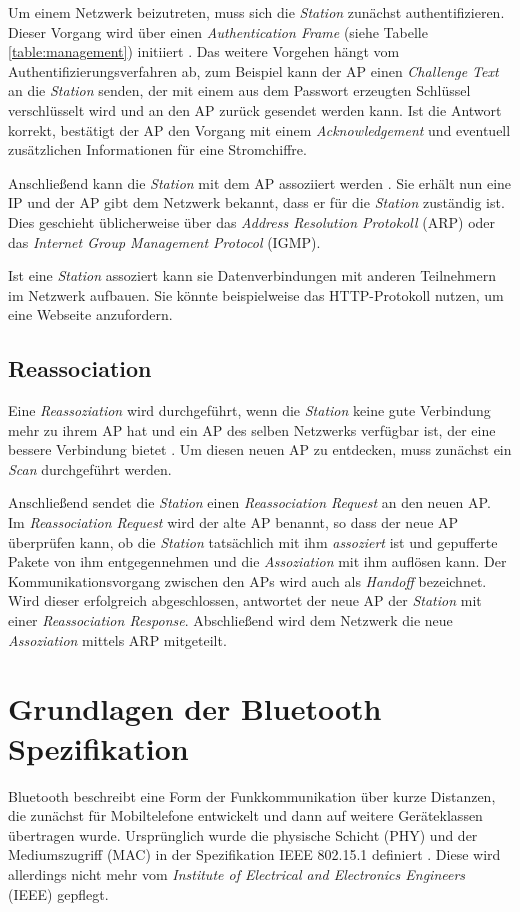 Um einem Netzwerk beizutreten, muss sich die \emph{Station} zunächst authentifizieren. 
Dieser Vorgang wird über einen \emph{Authentication Frame} (siehe Tabelle \ref{table:management}) initiiert \cite{ieee2012auth}. 
Das weitere Vorgehen hängt vom Authentifizierungsverfahren ab, zum Beispiel kann der AP einen \emph{Challenge Text} an die \emph{Station} senden, der mit einem aus dem Passwort erzeugten Schlüssel verschlüsselt wird und an den AP zurück gesendet werden kann. 
Ist die Antwort korrekt, bestätigt der AP den Vorgang mit einem \emph{Acknowledgement} und eventuell zusätzlichen Informationen für eine Stromchiffre. 

Anschließend kann die \emph{Station} mit dem AP assoziiert werden \cite{ieee2012associate}. 
Sie erhält nun eine IP und der AP gibt dem Netzwerk bekannt, dass er für die \emph{Station} zuständig ist. 
Dies geschieht üblicherweise über das \emph{Address Resolution Protokoll} (ARP) oder das \emph{Internet Group Management Protocol} (IGMP).

Ist eine \emph{Station} assoziert kann sie Datenverbindungen mit anderen Teilnehmern im Netzwerk aufbauen.
Sie könnte beispielweise das HTTP-Protokoll nutzen, um eine Webseite anzufordern.

\subsection{Reassociation}
Eine \emph{Reassoziation} wird durchgeführt, wenn die \emph{Station} keine gute Verbindung mehr zu ihrem AP hat und ein AP des selben Netzwerks verfügbar ist, der eine bessere Verbindung bietet \cite{ieee2012reassociate}.
Um diesen neuen AP zu entdecken, muss zunächst ein \emph{Scan} durchgeführt werden. 

Anschließend sendet die \emph{Station} einen \emph{Reassociation Request} an den neuen AP. 
Im \emph{Reassociation Request} wird der alte AP benannt, so dass der neue AP überprüfen kann, ob die \emph{Station} tatsächlich mit ihm \emph{assoziert} ist und gepufferte Pakete von ihm entgegennehmen und die \emph{Assoziation} mit ihm auflösen kann.
Der Kommunikationsvorgang zwischen den APs wird auch als \emph{Handoff} bezeichnet. 
Wird dieser erfolgreich abgeschlossen, antwortet der neue AP der \emph{Station} mit einer \emph{Reassociation Response}.
Abschließend wird dem Netzwerk die neue \emph{Assoziation} mittels ARP mitgeteilt.


\section{Grundlagen der Bluetooth Spezifikation}
Bluetooth beschreibt eine Form der Funkkommunikation über kurze Distanzen, die zunächst für Mobiltelefone entwickelt und dann auf weitere Geräteklassen übertragen wurde.
Ursprünglich wurde die physische Schicht (PHY) und der Mediumszugriff (MAC) in der Spezifikation IEEE 802.15.1 definiert \cite{ieee2002blue}. 
Diese wird allerdings nicht mehr vom \emph{Institute of Electrical and Electronics Engineers} (IEEE) gepflegt. 

